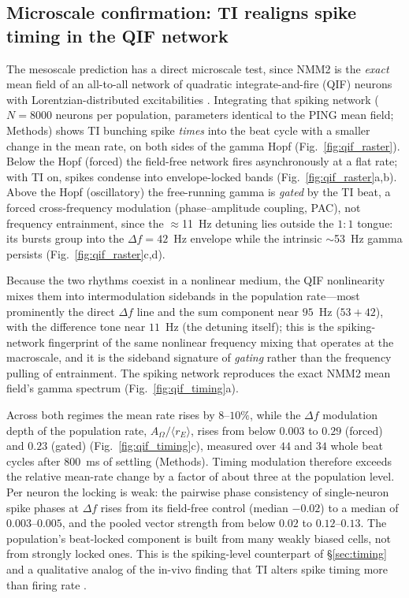\documentclass[11pt,a4paper]{article}
\begin{document}
\subsection{Microscale confirmation: TI realigns spike timing in the QIF network}\label{sec:qif}
The mesoscale prediction has a direct microscale test, since NMM2 is the \emph{exact} mean
field of an all-to-all network of quadratic integrate-and-fire (QIF) neurons with
Lorentzian-distributed excitabilities
\cite{montbrio2015,ruffini2025rosetta,clusella2023}. Integrating that spiking network
($N=8000$ neurons per population, parameters identical to the PING mean field; Methods)
shows TI bunching spike \emph{times} into the beat cycle with a smaller change in the mean
rate, on both sides of the gamma Hopf (Fig.~\ref{fig:qif_raster}). Below the Hopf (forced)
the field-free network fires asynchronously at a flat rate; with TI on, spikes condense
into envelope-locked bands (Fig.~\ref{fig:qif_raster}a,b). Above the Hopf (oscillatory) the
free-running gamma is \emph{gated} by the TI beat, a forced cross-frequency modulation
(phase--amplitude coupling, PAC), not frequency entrainment, since the $\approx$11~Hz detuning lies outside the
$1{:}1$ tongue: its bursts group into the $\Delta f=42$~Hz envelope while the intrinsic
$\sim$53~Hz gamma persists (Fig.~\ref{fig:qif_raster}c,d).

Because the two rhythms coexist
in a nonlinear medium, the QIF nonlinearity mixes them into intermodulation sidebands in
the population rate---most prominently the direct $\Delta f$ line and the sum component near
$95$~Hz ($53\!+\!42$), with the difference tone near $11$~Hz (the detuning itself); this is
the spiking-network fingerprint of the same nonlinear frequency mixing that operates at the
macroscale, and it is the sideband signature of \emph{gating} rather than the frequency
pulling of entrainment. The spiking network reproduces
the exact NMM2 mean field's gamma spectrum (Fig.~\ref{fig:qif_timing}a).

Across both regimes the mean rate rises by $8$--$10\%$, while the $\Delta f$ modulation depth of the
population rate, $A_\Omega/\langle r_E\rangle$, rises from below $0.003$ to $0.29$ (forced)
and $0.23$ (gated) (Fig.~\ref{fig:qif_timing}c), measured over $44$ and $34$ whole beat
cycles after $800$~ms of settling (Methods). Timing modulation therefore exceeds the
relative mean-rate change by a factor of about three at the population level. Per neuron
the locking is weak: the pairwise phase consistency of single-neuron spike phases at
$\Delta f$ rises from its field-free control (median $-0.02$) to a median of
$0.003$--$0.005$, and the pooled vector strength from below $0.02$ to $0.12$--$0.13$. The
population's beat-locked component is built from many weakly biased cells, not from
strongly locked ones. This is the spiking-level counterpart of \S\ref{sec:timing} and a
qualitative analog of the in-vivo finding that TI alters spike timing more than firing
rate \cite{vieira2024}.
\end{document}
